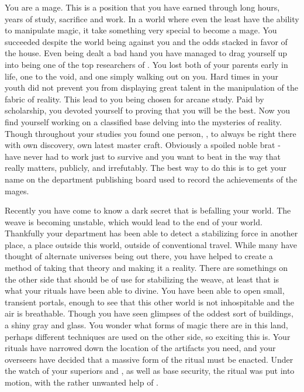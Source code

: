 \documentclass[char]{guildcamp3}
\begin{document}
\name{\cMageTwo{}}


You are a mage. This is a position that you have earned through long hours, years of study, sacrifice and work. In a world where even the least have the ability to manipulate magic, it take something very special to become a mage. You succeeded despite the world being against you and the odds stacked in favor of the house. Even being dealt a bad hand you have managed to drag yourself up into being one of the top researchers of \bMagicWorld{}. You lost both of your parents early in life, one to the void, and one simply walking out on you. Hard times in your youth did not prevent you from displaying great talent in the manipulation of the fabric of reality. This lead to you being chosen for arcane study. Paid by scholarship, you devoted yourself to proving that you will be the best. Now you find yourself working on a classified base delving into the mysteries of reality. Though throughout your studies you found one person, \cMageOne{\intro}, to always be right there with \cMageOne{\their} own discovery, \cMageOne{\their} own latest master craft. Obviously a spoiled noble brat -  have never had to work just to survive and you want to beat \cMageOne{\them} in the way that really matters, publicly, and irrefutably. The best way to do this is to get your name on the department publishing board used to record the achievements of the mages.

Recently you have come to know a dark secret that is befalling your world. The weave is becoming unstable, which would lead to the end of your world. Thankfully your department has been able to detect a stabilizing force in another place, a place outside this world, outside of conventional travel. While many have thought of alternate universes being out there, you have helped to create a method of taking that theory and making it a reality. There are somethings on the other side that should be of use for stabilizing the weave, at least that is what your rituals have been able to divine. You have been able to open small, transient portals, enough to see that this other world is not inhospitable and the air is breathable. Though you have seen glimpses of the oddest sort of buildings, a shiny gray and glass. You wonder what forms of magic there are in this land, perhaps different techniques are used on the other side, so exciting this is. Your rituals have narrowed down the location of the artifacts you need, and your overseers have decided that a massive form of the ritual must be enacted. Under the watch of your superiors \cNobleOne{\intro} and \cNobleTwo{\intro}, as well as base security, the ritual was put into motion, with the rather unwanted help of \cMageTwo{}. 
\end{document}
